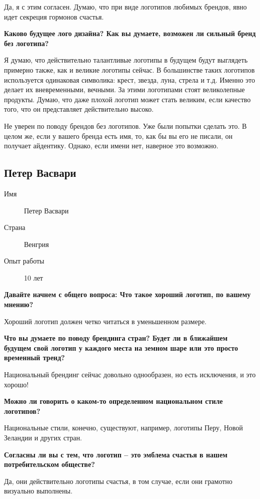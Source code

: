 Да, я с этим согласен. Думаю, что при виде логотипов любимых брендов, явно идет секреция гормонов счастья.


\textbf{Каково будущее лого дизайна? Как вы думаете, возможен ли сильный бренд без логотипа?}

Я думаю, что действительно талантливые логотипы в будущем будут выглядеть примерно также, как и великие логотипы сейчас. В большинстве таких логотипов используется одинаковая символика: крест, звезда, луна, стрела и т.д. Именно это делает их вневременными, вечными. За этими логотипами стоят великолепные продукты. Думаю, что даже плохой логотип может стать великим, если качество того, что он представляет действительно высоко.

Не уверен по поводу брендов без логотипов. Уже были попытки сделать это.
В целом же, если у вашего бренда есть имя, то, как бы вы его не писали, он получает айдентику. Однако, если имени нет, наверное это возможно.


\clearpage
\subsection{Петер Васвари}

\begin{description}
\item[Имя] Петер Васвари
\item[Страна] Венгрия
\item[Опыт работы] 10 лет
\end{description}

\textbf{Давайте начнем с общего вопроса: Что такое хороший логотип, по вашему мнению?}

Хороший логотип должен четко читаться в уменьшенном размере.


\textbf{Что вы думаете по поводу брендинга стран? Будет ли в ближайшем будущем свой логотип у каждого места на земном шаре или это просто временный тренд?}

Национальный брендинг сейчас довольно однообразен, но есть исключения, и это хорошо!


\textbf{Можно ли говорить о каком-то определенном национальном стиле логотипов?}

Национальные стили, конечно, существуют, например, логотипы Перу, Новой Зеландии и других стран.

\textbf{Согласны ли вы с тем, что логотип – это эмблема счастья в нашем потребительском обществе?}

Да, они действительно логотипы счастья, в том случае, если они грамотно визуально выполнены.


